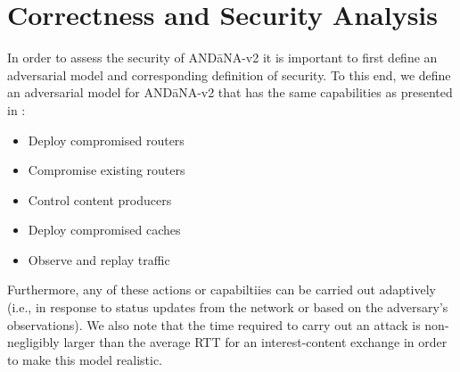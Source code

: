 \documentclass[10pt]{article}
\begin{document}

\section{Correctness and Security Analysis}
In order to assess the security of {\sf AND\=aNA-v2} it is important to first define an adversarial model and corresponding definition of security. To this end, we define an adversarial model for {\sf AND\=aNA-v2} that has the same capabilities as presented in \cite{andana}:
\begin{itemize}
	\item Deploy compromised routers
	\item Compromise existing routers
	\item Control content producers
	\item Deploy compromised caches
	\item Observe and replay traffic
\end{itemize}
Furthermore, any of these actions or capabiltiies can be carried out adaptively (i.e., in response to status updates from the network or based on the adversary's observations). We also note that the time required to carry out an attack is non-negligibly larger than the average RTT for an interest-content exchange in order to make this model realistic. 
\end{document}
